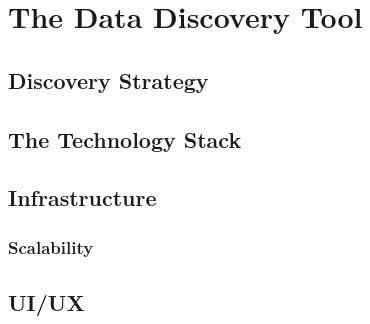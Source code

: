 \chapter{The Data Discovery Tool}\label{ch:ch2label}

\section{Discovery Strategy}

\section{The Technology Stack}

\section{Infrastructure}

\subsection{Scalability}

\section{UI/UX}